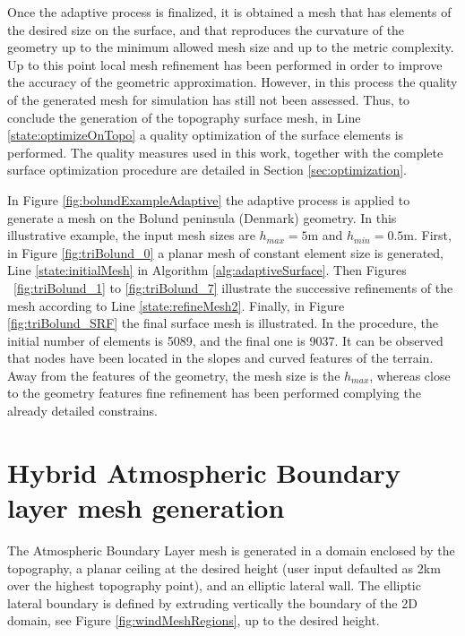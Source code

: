 \documentclass[1p]{elsarticle}
\begin{document}
Once the adaptive process is finalized, it is obtained  a mesh that has elements of the desired size on the surface, and that reproduces the curvature of the geometry up to the minimum allowed mesh size and up to the metric complexity. 
Up to this point local mesh refinement has been performed in order to improve the accuracy of the geometric approximation.
However, in this process the quality of the generated mesh for simulation has still not been assessed. Thus, to conclude the generation of the topography surface mesh, in Line \ref{state:optimizeOnTopo} a quality optimization of the surface elements is performed.
The quality measures used in this work, together with the complete surface optimization procedure are detailed in Section \ref{sec:optimization}.


In Figure \ref{fig:bolundExampleAdaptive} the adaptive process is applied to generate a mesh on the Bolund peninsula (Denmark) geometry.
In this illustrative example, the input mesh sizes are $h_{max}=5$m and $h_{min}=0.5$m.
First, in Figure \ref{fig:triBolund_0} a planar mesh of constant element size is generated, Line \ref{state:initialMesh} in Algorithm \ref{alg:adaptiveSurface}. Then Figures  \ref{fig:triBolund_1} to \ref{fig:triBolund_7} illustrate the successive refinements of the mesh according to Line \ref{state:refineMesh2}. Finally, in Figure \ref{fig:triBolund_SRF} the final surface mesh is illustrated. In the procedure, the initial number of elements is 5089, and the final one is 9037. 
It can be observed that nodes have been located in the slopes and curved features of the terrain. Away from the features of the geometry, the mesh size is the  $h_{max}$, whereas close to the geometry features fine refinement has been performed complying the already detailed constrains.



\section{Hybrid Atmospheric Boundary layer mesh generation}
\label{sec:volume}

The Atmospheric Boundary Layer mesh is generated in a domain enclosed by the topography, a planar ceiling at the desired height (user input defaulted as 2km over the highest topography point), and an elliptic lateral wall. The elliptic lateral boundary is defined by extruding vertically the boundary of the 2D domain, see Figure \ref{fig:windMeshRegions}, up to the desired height. 
\end{document}

